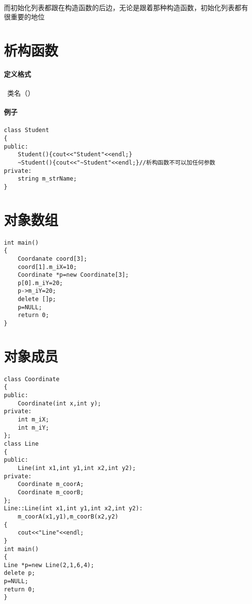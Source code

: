 \documentclass{article}
\begin{document}
\begin{CJK}{UTF8}{gbsn}
\paragraph{}
而初始化列表都跟在构造函数的后边，无论是跟着那种构造函数，初始化列表都有很重要的地位
\section{析构函数}
\paragraph{定义格式}
\paragraph{}
~类名（）
\paragraph{例子}
\paragraph{}
\begin{verbatim}
class Student
{
public:
	Student(){cout<<"Student"<<endl;}
	~Student(){cout<<"~Student"<<endl;}//析构函数不可以加任何参数
private:
	string m_strName;
}
\end{verbatim}
\section{对象数组}
\paragraph{}
\begin{verbatim}
int main()
{
	Coordanate coord[3];
	coord[1].m_iX=10;
	Coordinate *p=new Coordinate[3];
	p[0].m_iY=20;
	p->m_iY=20;
	delete []p;
	p=NULL;
	return 0;
}
\end{verbatim}
\section{对象成员}
\paragraph{}
\begin{verbatim}
class Coordinate
{
public:
	Coordinate(int x,int y);
private:
	int m_iX;
	int m_iY;
};
class Line
{
public:
	Line(int x1,int y1,int x2,int y2);
private:
	Coordinate m_coorA;
	Coordinate m_coorB;
};
Line::Line(int x1,int y1,int x2,int y2):
	m_coorA(x1,y1),m_coorB(x2,y2)
{
	cout<<"Line"<<endl;
}
int main()
{
Line *p=new Line(2,1,6,4);
delete p;
p=NULL;
return 0;
} 
\end{verbatim}

\end{CJK}
\end{document}
